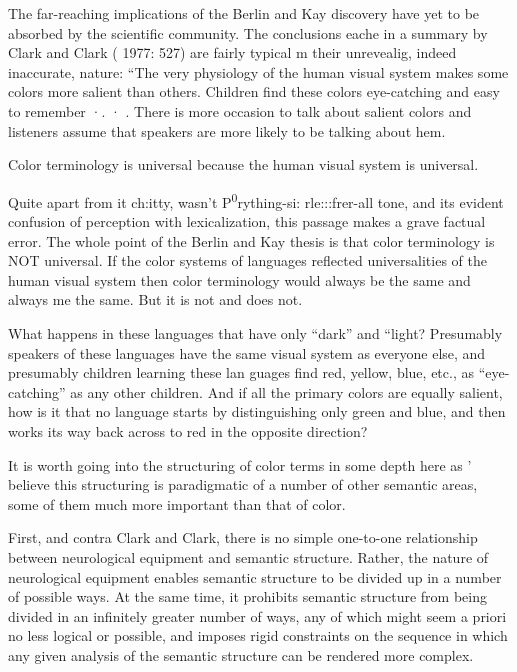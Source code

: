 The far-reaching implications of the Berlin and Kay discovery have yet to be absorbed by the scientific community. The conclusions eache in a summary by Clark and Clark ( 1977: 527) are fairly typical m their unrevealig, indeed inaccurate, nature: ``The very physiology of the human visual system makes some colors more salient than others. Children find these colors eye-catching and easy to remem\-ber ·. · . There is more occasion to talk about salient colors and listeners assume that speakers are more likely to be talking about hem.

Color terminology is universal because the human visual system is universal.{\textquotedbl}

Quite apart from it ch:itty, wasn't P{\textquotedbl}\textsuperscript{0}rything-si: rle:::frer-all tone, and its evident confusion of perception with lexicalization, this passage makes a grave factual error. The whole point of the Berlin and Kay thesis is that color terminology is NOT universal. If the color systems of languages reflected universalities of the human visual system
then color terminology would always be the same and always me the same. But it is not and does not.

What happens in these languages that have only ``dark'' and ``light{\textquotedbl}? Presumably speakers of these languages have the same visual system as everyone else, and presumably children learning these lan%
guages find red, yellow, blue, etc., as ``eye-catching'' as any other children. And if all the primary colors are equally salient, how is it that no language starts by distinguishing only green and blue, and then works its way back across to red in the opposite direction?

It is worth going into the structuring of color terms in some depth here as ' believe this structuring is paradigmatic of a number of other semantic areas, some of them much more important than that of color.

First, and contra Clark and Clark, there is no simple one-to-one relationship between neurological equipment and semantic structure. Rather, the nature of neurological equipment enables semantic struc\-ture to be divided up in a number of possible ways. At the same time, it prohibits semantic structure from being divided in an infinitely greater number of ways, any of which might seem a priori no less logical or possible, and imposes rigid constraints on the sequence in which any given analysis of the semantic structure can be rendered more complex.

